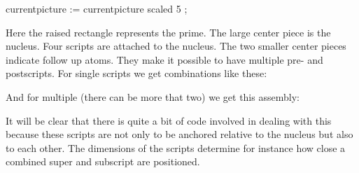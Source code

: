     currentpicture := currentpicture scaled 5 ;
\stopMPcode
\stoplinecorrection

Here the raised rectangle represents the prime. The large center piece is the
nucleus. Four scripts are attached to the nucleus. The two smaller center pieces
indicate follow up atoms. They make it possible to have multiple pre- and
postscripts. For single scripts we get combinations like these:

\startlinecorrection
{} {}
    {} {}
    {} {}
    {} {}
    {} {}
    {} {}
\stopcombination
\stoplinecorrection

And for multiple (there can be more that two) we get this assembly:

\startlinecorrection
{} {}
    {} {}
    {} {}
    {} {}
    {} {}
    {} {}
\stopcombination
\stoplinecorrection

It will be clear that there is quite a bit of code involved in dealing with this
because these scripts are not only to be anchored relative to the nucleus but
also to each other. The dimensions of the scripts determine for instance how
close a combined super and subscript are positioned.

